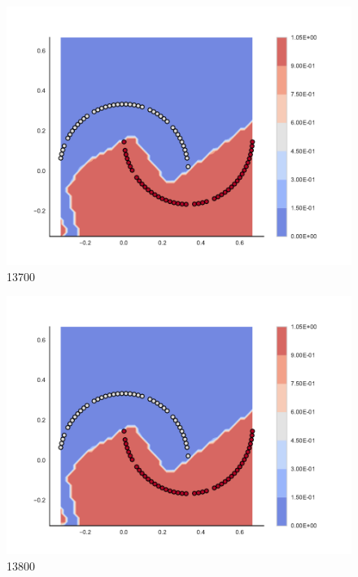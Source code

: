 \begin{subfigure}[b]{0.09\textwidth}
    \includegraphics[clip, trim=2.35cm 1.75cm 4.5cm 0cm,width=\textwidth]{img/convergence/13700.pdf}
    \caption{13700}
    \label{fig:convergence_13700}
\end{subfigure}
%
\begin{subfigure}[b]{0.09\textwidth}
    \includegraphics[clip, trim=2.35cm 1.75cm 4.5cm 0cm,width=\textwidth]{img/convergence/13800.pdf}
    \caption{13800}
    \label{fig:convergence_13800}
\end{subfigure}
%
